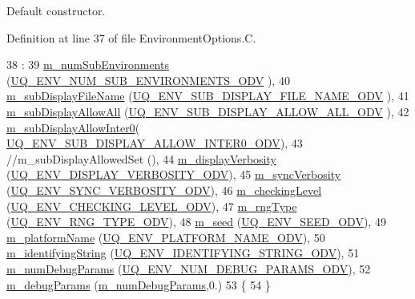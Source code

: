 Default constructor. 



Definition at line 37 of file Environment\-Options.\-C.


\begin{DoxyCode}
38   :
39   \hyperlink{class_q_u_e_s_o_1_1_env_options_values_a0a53bbc1544a519eb50faddcfae0cedd}{m\_numSubEnvironments}   (\hyperlink{_environment_options_8h_aa218bd19c1b15600e9fc4aea92000417}{UQ\_ENV\_NUM\_SUB\_ENVIRONMENTS\_ODV}
      ),
40   \hyperlink{class_q_u_e_s_o_1_1_env_options_values_ae92ff6d68751d90fd6fbb7de98e66ef2}{m\_subDisplayFileName}   (\hyperlink{_environment_options_8h_adb73e22ce84a516af0ad8860409588c5}{UQ\_ENV\_SUB\_DISPLAY\_FILE\_NAME\_ODV}
      ),
41   \hyperlink{class_q_u_e_s_o_1_1_env_options_values_a942d62cb804c174e1de76cc776368924}{m\_subDisplayAllowAll}   (\hyperlink{_environment_options_8h_ac435da3ea28649fbfb1f79e08c5e9a45}{UQ\_ENV\_SUB\_DISPLAY\_ALLOW\_ALL\_ODV}
      ),
42   \hyperlink{class_q_u_e_s_o_1_1_env_options_values_ae7b34ee974716034ae21a2c39891b8c3}{m\_subDisplayAllowInter0}(
      \hyperlink{_environment_options_8h_a848e049bac92957c3bf2b4897d70557f}{UQ\_ENV\_SUB\_DISPLAY\_ALLOW\_INTER0\_ODV}),
43 \textcolor{comment}{//m\_subDisplayAllowedSet (),}
44   \hyperlink{class_q_u_e_s_o_1_1_env_options_values_aacf4ef43ac39a6118ca3e9bb7f0f8414}{m\_displayVerbosity}     (\hyperlink{_environment_options_8h_aa0aed60fbfac9147a8f4d02f5e57fc3c}{UQ\_ENV\_DISPLAY\_VERBOSITY\_ODV}),
45   \hyperlink{class_q_u_e_s_o_1_1_env_options_values_a572ccae8dda30e5161c427d94d83fe34}{m\_syncVerbosity}        (\hyperlink{_environment_options_8h_a4388bca2484d2787f65db58c924e4663}{UQ\_ENV\_SYNC\_VERBOSITY\_ODV}),
46   \hyperlink{class_q_u_e_s_o_1_1_env_options_values_a8c6ef31adcc7909b75a83cf30e698b7d}{m\_checkingLevel}        (\hyperlink{_environment_options_8h_af34c1c6676f7044beafb32dab1a1301a}{UQ\_ENV\_CHECKING\_LEVEL\_ODV}),
47   \hyperlink{class_q_u_e_s_o_1_1_env_options_values_a01502ec46080bf43c99d55646e6a1b7f}{m\_rngType}              (\hyperlink{_environment_options_8h_a706f5da95b8e726b803ef2b7e3dcb7c9}{UQ\_ENV\_RNG\_TYPE\_ODV}),
48   \hyperlink{class_q_u_e_s_o_1_1_env_options_values_adf0629a19e30b4f907b2e5fc90c9830a}{m\_seed}                 (\hyperlink{_environment_options_8h_a46ccfdca1dd926bb77e0a35061f7b8e2}{UQ\_ENV\_SEED\_ODV}),
49   \hyperlink{class_q_u_e_s_o_1_1_env_options_values_aaecd649e9d424572e66db71533af1913}{m\_platformName}         (\hyperlink{_environment_options_8h_af3bd1899c8b9dd8693709bfde2380b54}{UQ\_ENV\_PLATFORM\_NAME\_ODV}),
50   \hyperlink{class_q_u_e_s_o_1_1_env_options_values_a4d704b461389c12e658e1e5e811ccb18}{m\_identifyingString}    (\hyperlink{_environment_options_8h_acd20b252766664d5f0d557b1b99ae9cd}{UQ\_ENV\_IDENTIFYING\_STRING\_ODV}),
51   \hyperlink{class_q_u_e_s_o_1_1_env_options_values_ab03e99e270e681196428683a3ad0de63}{m\_numDebugParams}       (\hyperlink{_environment_options_8h_afc461b58cef6f59de0d02dd6ee425f88}{UQ\_ENV\_NUM\_DEBUG\_PARAMS\_ODV}),
52   \hyperlink{class_q_u_e_s_o_1_1_env_options_values_aef18abb5a1cf76c527b03342e2c2e8b1}{m\_debugParams}          (\hyperlink{class_q_u_e_s_o_1_1_env_options_values_ab03e99e270e681196428683a3ad0de63}{m\_numDebugParams},0.)
53 \{
54 \}
\end{DoxyCode}
